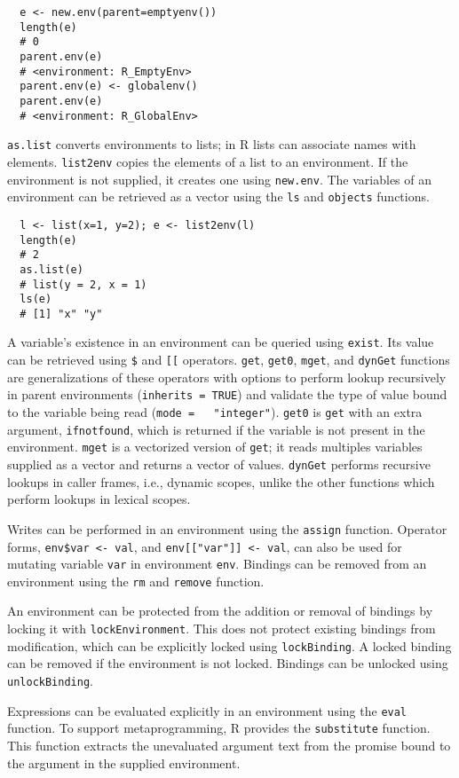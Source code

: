 \documentclass[10pt,review,sigplan,authorversion=true]{acmart}
\newcommand{\code}[1]{\lstinline |#1|\xspace}
\newcommand{\newEnv}{\code{new.env}}
\newcommand{\asList}{\code{as.list}}
\newcommand{\listToEnv}{\code{list2env}}
\newcommand{\ls}{\code{ls}}
\newcommand{\objects}{\code{objects}}
\newcommand{\subDollar}{\code{$}}
\newcommand{\subBracket}{\code{[[}}
\newcommand{\exist}{\code{exist}}
\newcommand{\get}{\code{get}}
\newcommand{\getZero}{\code{get0}}
\newcommand{\mget}{\code{mget}}
\newcommand{\dynGet}{\code{dynGet}}
\newcommand{\assign}{\code{assign}}
\newcommand{\remove}{\code{remove}}
\renewcommand{\rm}{\code{rm}}
\newcommand{\lockEnvironment}{\code{lockEnvironment}}
\newcommand{\lockBinding}{\code{lockBinding}}
\newcommand{\unlockBinding}{\code{unlockBinding}}
\newcommand{\eval}{\code{eval}}
\newcommand{\substitute}{\code{substitute}}
\begin{document}
\begin{lstlisting}
  e <- new.env(parent=emptyenv())
  length(e)
  # 0
  parent.env(e)
  # <environment: R_EmptyEnv>
  parent.env(e) <- globalenv()
  parent.env(e)
  # <environment: R_GlobalEnv>
\end{lstlisting}

\asList converts environments to lists; in R lists can associate names with
elements. \listToEnv copies the elements of a list to an environment. If the
environment is not supplied, it creates one using \newEnv. The variables of an
environment can be retrieved as a vector using the \ls and \objects functions.

\begin{lstlisting}
  l <- list(x=1, y=2); e <- list2env(l)
  length(e)
  # 2
  as.list(e)
  # list(y = 2, x = 1)
  ls(e)
  # [1] "x" "y"
\end{lstlisting}

\noindent
A variable's existence in an environment can be queried using \exist. Its value
can be retrieved using \subDollar and \subBracket operators. \get, \getZero,
\mget, and \dynGet functions are generalizations of these operators with options
to perform lookup recursively in parent environments (\code{inherits = TRUE})
and validate the type of value bound to the variable being read (\code{mode =
  "integer"}). \getZero is \get with an extra argument, \code{ifnotfound}, which
is returned if the variable is not present in the environment. \mget is a
vectorized version of \get; it reads multiples variables supplied as a vector
and returns a vector of values. \dynGet performs recursive lookups in caller
frames, i.e., dynamic scopes, unlike the other functions which perform lookups in
lexical scopes.

Writes can be performed in an environment using the \assign function. Operator
forms, \code{env$var <- val}, and \code{env[["var"]] <- val}, can also be used
for mutating variable \code{var} in environment \code{env}. Bindings
can be removed from an environment using the \rm and \remove function.

An environment can be protected from the addition or removal of bindings by
locking it with \lockEnvironment. This does not protect existing bindings from
modification, which can be explicitly locked using \lockBinding. A locked
binding can be removed if the environment is not locked. Bindings can be
unlocked using \unlockBinding.

Expressions can be evaluated explicitly in an environment using the \eval
function. To support metaprogramming, R provides the \substitute function. This
function extracts the unevaluated argument text from the promise bound to the
argument in the supplied environment.
\end{document}
